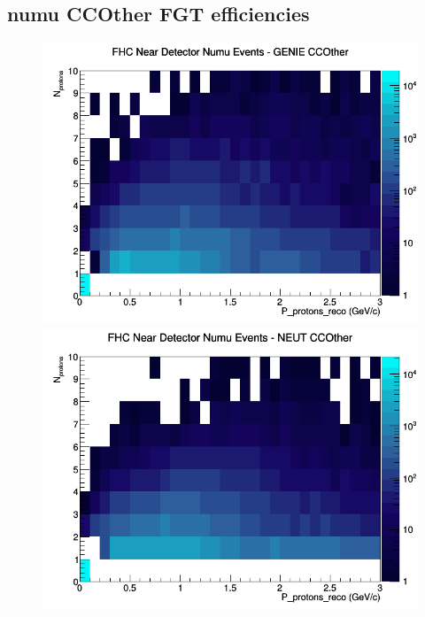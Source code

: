 \documentclass[12pt]{article}
\begin{document}
\subsection{numu CCOther FGT efficiencies}
\begin{figure}[h]
\includegraphics[width=\linewidth]{eff_N_P/FGT/protons/CCOther_FHC_ND_numu_N_P_GENIE.png}
\endminipage
{}
\includegraphics[width=\linewidth]{eff_N_P/FGT/protons/CCOther_FHC_ND_numu_N_P_NEUT.png}
\endminipage
{}

\end{figure}
\end{document}
